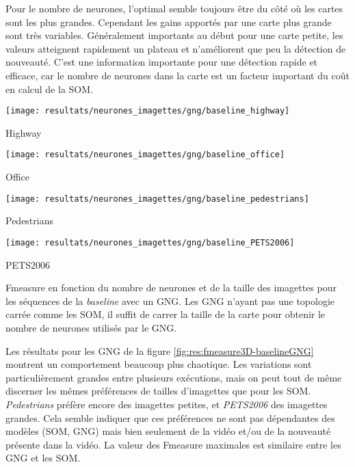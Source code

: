 	Pour le nombre de neurones, l'optimal semble toujours être du côté où les cartes sont les plus grandes. Cependant les gains apportés par une carte plus grande sont très variables. Généralement importants au début pour une carte petite, les valeurs atteignent rapidement un plateau et n'améliorent que peu la détection de nouveauté. C'est une information importante pour une détection rapide et efficace, car le nombre de neurones dans la carte est un facteur important du coût en calcul de la SOM.

	\begin{figureth}
		\begin{subfigureth}{.49\textwidth}
			\texttt{[image: resultats/neurones\_imagettes/gng/baseline\_highway]}\caption{Highway}
		\end{subfigureth}
		\begin{subfigureth}{.49\textwidth}
			\texttt{[image: resultats/neurones\_imagettes/gng/baseline\_office]}\caption{Office}
		\end{subfigureth}
		\begin{subfigureth}{.49\textwidth}
			\texttt{[image: resultats/neurones\_imagettes/gng/baseline\_pedestrians]}\caption{Pedestrians}
		\end{subfigureth}
		\begin{subfigureth}{.49\textwidth}
			\texttt{[image: resultats/neurones\_imagettes/gng/baseline\_PETS2006]}\caption{PETS2006}
		\end{subfigureth}
		\caption[Fmeasure en fonction du nombre de neurones et de la taille des imagettes, GNG baseline]{Fmeasure en fonction du nombre de neurones et de la taille des imagettes pour les séquences de la \textit{baseline} avec un GNG. Les GNG n'ayant pas une topologie carrée comme les SOM, il suffit de carrer la taille de la carte pour obtenir le nombre de neurones utilisés par le GNG.}\label{fig:res:fmeasure3D-baselineGNG}
	\end{figureth}

	Les résultats pour les GNG de la figure \ref{fig:res:fmeasure3D-baselineGNG} montrent un comportement beaucoup plus chaotique. Les variations sont particulièrement grandes entre plusieurs exécutions, mais on peut tout de même discerner les mêmes préférences de tailles d'imagettes que pour les SOM. \textit{Pedestrians} préfère encore des imagettes petites, et \textit{PETS2006} des imagettes grandes. Cela semble indiquer que ces préférences ne sont pas dépendantes des modèles (SOM, GNG) mais bien seulement de la vidéo et/ou de la nouveauté présente dans la vidéo. La valeur des Fmeasure maximales est similaire entre les GNG et les SOM. 

